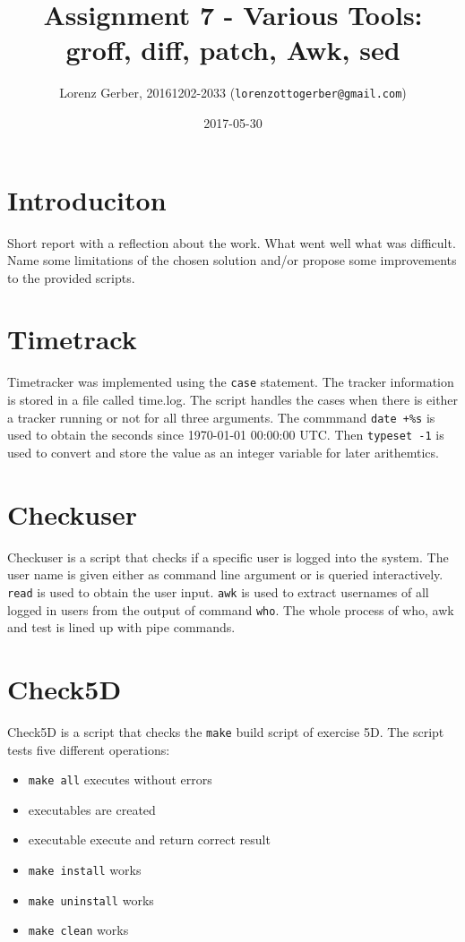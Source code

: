 \documentclass[a4paper,11pt,twoside]{article}
\title{Assignment 7 - Various Tools: groff, diff, patch, Awk, sed }
\author{Lorenz Gerber, 20161202-2033 ({\tt{lorenzottogerber@gmail.com}})}
\date{2017-05-30}
\begin{document}
\lstset{language=C}
\maketitle
\thispagestyle{empty}
\newpage

\clearpage
{}

\section{Introduciton}
Short report with a reflection about the work. What went well what was difficult. Name some limitations of the chosen solution and/or propose some improvements to the provided scripts.

\section{Timetrack}
Timetracker was implemented using the \verb+case+ statement. The tracker information is stored in a file called time.log. The script handles the cases when there is either a tracker running or not for all three arguments.
The commmand \verb?date +%s? is used to obtain the seconds since 1970-01-01 00:00:00 UTC. Then \verb?typeset -1? is used to convert and store the value as an integer variable for later arithemtics.

\section{Checkuser}
Checkuser is a script that checks if a specific user is logged into the system. The user name is given either as command line argument or is queried interactively. \verb+read+ is used to obtain the user input. \verb+awk+ is used to extract usernames of all logged in users from the output of command \verb+who+. The whole process of who, awk and test is lined up with pipe commands.

\section{Check5D}
Check5D is a script that checks the \verb+make+ build script of exercise 5D. The script tests five different operations:
\begin{itemize}
\item \verb+make all+ executes without errors
\item executables are created
\item executable execute and return correct result
\item \verb+make install+ works
\item \verb+make uninstall+ works
\item \verb+make clean+ works
\end{itemize}
\end{document}
